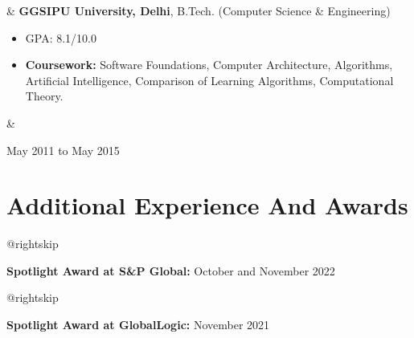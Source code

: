 \documentclass[10pt, letterpaper]{article}
\newenvironment{highlights}{
        \begin{itemize}[
                topsep=0pt,
                parsep=0.10cm,
                partopsep=0pt,
                itemsep=0pt,
                after=\vspace{-1\baselineskip},
                leftmargin=0.4cm + 3pt
            ]
    }{
        \end{itemize}
    } %
\let\originalTabularx\tabularx
\let\originalEndTabularx\endtabularx
\renewenvironment{tabularx}{\bgroup\centering\originalTabularx}{\originalEndTabularx\par\egroup}
\begin{document}
        \begin{tabularx}{
            \textwidth-0.4 cm-0.13cm
        }{
            L{0.85cm}
            K{0.2cm}
            R{4.1cm}
        }
            \textbf{}
            &
            \textbf{GGSIPU University, Delhi}, B.Tech. (Computer Science \& Engineering)

            \vspace{0.10cm}

            \begin{highlights}
                \item GPA: 8.1/10.0
                \item \textbf{Coursework:} Software Foundations, Computer Architecture, Algorithms, Artificial Intelligence, Comparison of Learning Algorithms, Computational Theory.
            \end{highlights}
            &
            

            May 2011 to May 2015
        \end{tabularx}


    
    \section{Additional Experience And Awards}

        \begingroup\leftskip=0.2cm
        \advance\csname @rightskip\endcsname 0.2cm
        \advance\rightskip 0.2cm

        \textbf{Spotlight Award at S\&P Global:} October and November 2022 \par\endgroup

        \vspace{0.2cm}
        \begingroup\leftskip=0.2cm
        \advance\csname @rightskip\endcsname 0.2cm
        \advance\rightskip 0.2cm

        \textbf{Spotlight Award at GlobalLogic:} November 2021 \par\endgroup


    
\end{document}

